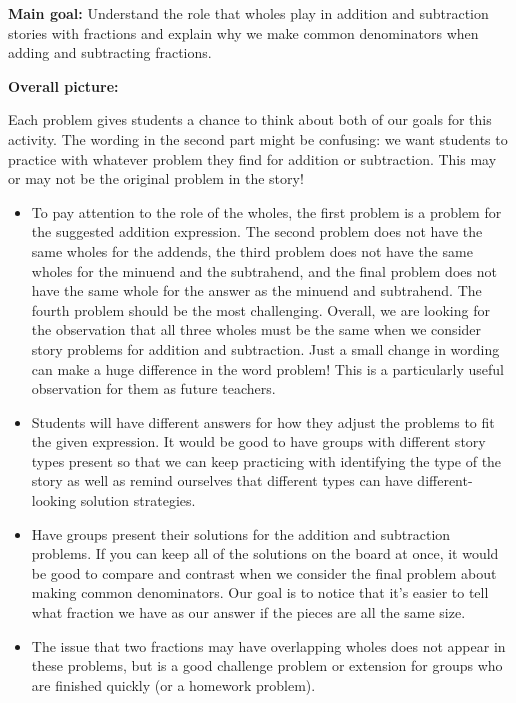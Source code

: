 \documentclass[nooutcomes,noauthor]{ximera}
\begin{document}
\begin{instructorNotes} 



{\bf Main goal:} Understand the role that wholes play in addition and subtraction stories with fractions and explain why we make common denominators when adding and subtracting fractions.

{\bf Overall picture:}

Each problem gives students a chance to think about both of our goals for this activity. The wording in the second part might be confusing: we want students to practice with whatever problem they find for addition or subtraction. This may or may not be the original problem in the story!

\begin{itemize}
	\item To pay attention to the role of the wholes, the first problem is a problem for the suggested addition expression. The second problem does not have the same wholes for the addends, the third problem does not have the same wholes for the minuend and the subtrahend, and the final problem does not have the same whole for the answer as the minuend and subtrahend. The fourth problem should be the most challenging. Overall, we are looking for the observation that all three wholes must be the same when we consider story problems for addition and subtraction. Just a small change in wording can make a huge difference in the word problem! This is a particularly useful observation for them as future teachers.
	\item Students will have different answers for how they adjust the problems to fit the given expression. It would be good to have groups with different story types present so that we can keep practicing with identifying the type of the story as well as remind ourselves that different types can have different-looking solution strategies.
	\item Have groups present their solutions for the addition and subtraction problems. If you can keep all of the solutions on the board at once, it would be good to compare and contrast when we consider the final problem about making common denominators. Our goal is to notice that it's easier to tell what fraction we have as our answer if the pieces are all the same size. 
	\item The issue that two fractions may have overlapping wholes does not appear in these problems, but is a good challenge problem or extension for groups who are finished quickly (or a homework problem).
\end{itemize}





\end{instructorNotes}
\end{document}
